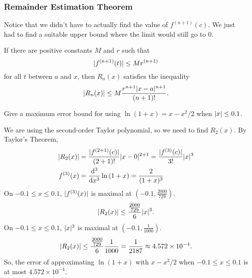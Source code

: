 \subsubsection{Remainder Estimation Theorem}
Notice that we didn't have to actually find the value of $f^{(n+1)}(c)$.
We just had to find a suitable upper bound where the limit would still go to 0.
\begin{theorem}
	If there are positive constants $M$ and $r$ such that
	\begin{equation*}
		\lvert f^{(n+1)}(t) \rvert \leq Mr^{(n+1)}
	\end{equation*}
	for all $t$ between $a$ and $x$, then $R_n(x)$ satisfies the inequality
	\begin{equation*}
		\lvert R_n(x) \rvert \leq M\frac{r^{n+1}\lvert x-a \rvert^{n+1}}{(n+1)!}.
	\end{equation*}
\end{theorem}

\begin{example}
	Give a maximum error bound for using $\ln{(1+x)} = x - x^2/2$ when $\lvert x \rvert \leq 0.1$.
\end{example}
We are using the second-order Taylor polynomial, so we need to find $R_2(x)$.
By Taylor's Theorem,
\begin{align*}
	\lvert R_2(x) \rvert &= \frac{\lvert f^{(2+1)}(c) \rvert}{(2+1)!}\lvert x-0 \rvert^{2+1}  = \frac{\lvert f^{(3)}(c) \rvert}{3!}\lvert x \rvert^3\\
	f^{(3)}(x) &= \frac{\mathrm{d} ^3}{\mathrm{d} x^3}\ln{(1+x)} = \frac{2}{(1+x)^3} \\
\end{align*}
\indent
On $-0.1 \leq x \leq 0.1$, $\lvert f^{(3)}(x) \rvert$ is maximal at $(-0.1, \frac{2000}{729})$.
\begin{equation*}
	\lvert R_2(x) \rvert \leq \frac{\frac{2000}{729}}{6}\lvert x \rvert^3.
\end{equation*}
\indent
On $-0.1 \leq x \leq 0.1$, $\lvert x \rvert^3$ is maximal at $(-0.1, \frac{1}{1000})$.
\begin{equation*}
	\lvert R_2(x) \rvert \leq \frac{\frac{2000}{729}}{6}\frac{1}{1000} = \frac{1}{2187} \approx 4.572 \times 10^{-4}. 
\end{equation*}
\indent
So, the error of approximating $\ln{(1+x)}$ with $x-x^2/2$ when $-0.1 \leq x \leq 0.1$ is at most $4.572 \times 10^{-4}$.